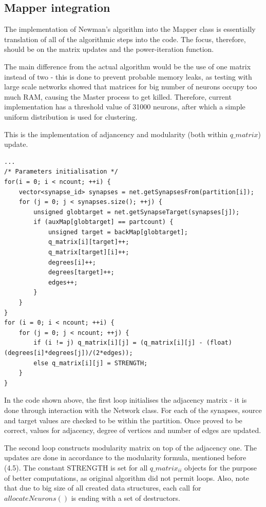 \subsection{Mapper integration}

The implementation of Newman's algorithm into the Mapper class is essentially translation of all of the algorithmic steps into the code. The focus, therefore, should be on the matrix updates and the power-iteration function.

The main difference from the actual algorithm would be the use of one matrix instead of two - this is done to prevent probable memory leaks, as testing with large scale networks showed that matrices for big number of neurons occupy too much RAM, causing the Master process to get killed. Therefore, current implementation has a threshold value of 31000 neurons, after which a simple uniform distribution is used for clustering.

This is the implementation of adjancency and modularity (both within $q\_matrix$) update.

\begin{center}
\lstset{
    caption = Code for Matrix update,
    basicstyle=\ttfamily\footnotesize\bfseries,
    frame=tb
}
\begin{lstlisting}
...
/* Parameters initialisation */
for(i = 0; i < ncount; ++i) {
	vector<synapse_id> synapses = net.getSynapsesFrom(partition[i]);
	for (j = 0; j < synapses.size(); ++j) {
		unsigned globtarget = net.getSynapseTarget(synapses[j]);
		if (auxMap[globtarget] == partcount) {
			unsigned target = backMap[globtarget];
			q_matrix[i][target]++;
			q_matrix[target][i]++;
			degrees[i]++;
			degrees[target]++;
			edges++;
		}
	}
}
for (i = 0; i < ncount; ++i) {
	for (j = 0; j < ncount; ++j) {
		if (i != j) q_matrix[i][j] = (q_matrix[i][j] - (float)(degrees[i]*degrees[j])/(2*edges));
		else q_matrix[i][j] = STRENGTH;
	}
}
\end{lstlisting}
\end{center}

In the code shown above, the first loop initialises the adjacency matrix - it is done through interaction with the Network class. For each of the synapses, source and target values are checked to be within the partition. Once proved to be correct, values for adjacency, degree of vertices and number of edges are updated.

The second loop constructs modularity matrix on top of the adjacency one. The updates are done in accordance to the modularity formula, mentioned before (4.5).
The constant STRENGTH is set for all $q\_matrix_{ii}$ objects for the purpose of better computations, as original algorithm did not permit loops.
Also, note that due to big size of all created data structures, each call for $allocateNeurons()$ is ending with a set of destructors.

